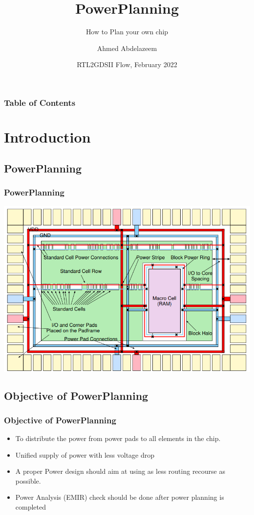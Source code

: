 \documentclass[compress]{beamer}
\title[ASIC Physical Design] %
{PowerPlanning}
\subtitle{How to Plan your own chip}
\author[Ahmed Abdelazeem] %
{Ahmed Abdelazeem}
\institute[ZU] %
{
	Faculty of Engineering\\
	Zagazig University
}
\date[ZU 2023] %
{RTL2GDSII Flow, February 2022}
\begin{document}
	
	\frame{\titlepage}
	
	
	\begin{frame}
		\frametitle{Table of Contents}
		\tableofcontents
	\end{frame}
\section[Intro]{Introduction}
\subsection[Design]{PowerPlanning}
\begin{frame}
	\frametitle{PowerPlanning}
	\begin{center}
		\includegraphics[width=\textwidth]{power}
	\end{center}
\end{frame}	
\subsection[Objective]{Objective of PowerPlanning}
\begin{frame}
	\frametitle{Objective of PowerPlanning}
	\begin{itemize}
		\item To distribute the power from power pads to all elements in the chip.
		\item Unified supply of power with less voltage drop
		\item A proper Power design should aim at using as less routing recourse as possible.
		\item Power Analysis (EMIR) check should be done after power planning is completed 
	\end{itemize}
\end{frame}
\end{document}
